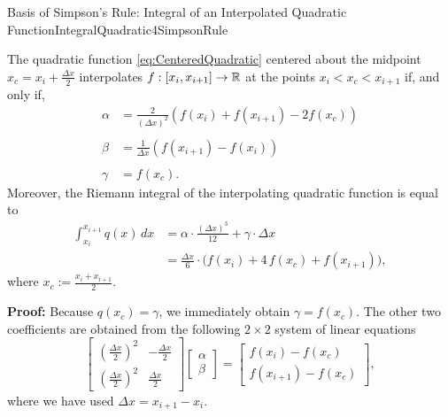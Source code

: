 \bigskip

\begin{propColor}{Basis of Simpson's Rule: Integral of an Interpolated Quadratic Function}{IntegralQuadratic4SimpsonRule} 

The quadratic function \eqref{eq:CenteredQuadratic} centered about the midpoint  $x_c = x_i + \frac{\Delta x}{2}$ interpolates $f:[x_i, x_{i+1}] \to \mathbb R$ at the points $x_i < x_c < x_{i+1}$ if, and only if,
\begin{equation}
    \label{eq:QuadraticInterpConditions}
    \begin{aligned}
        \alpha &= \frac{2}{(\Delta x )^2} \left( f(x_i) +  f(x_{i+1}) - 2 f(x_c) \right)   \\
        \\
         \beta &=   \frac{1}{\Delta x} \left( f(x_{i+1}) - f(x_i) \right)  \\
         \\
         \gamma &= f(x_c).
    \end{aligned}
\end{equation}
Moreover, the Riemann integral of the interpolating quadratic function is equal to
\begin{equation}
\begin{aligned}
\int_{x_i}^{x_{i+1}} q(x)\, dx & = \alpha \cdot \frac{(\Delta x)^3}{12} + \gamma \cdot \Delta x \\
      & = \frac{ \Delta x}{6} \cdot \big(  f(x_i) + 4 \, f(x_c) + f(x_{i+1}) \big),
\end{aligned}   
\end{equation}
where $x_c:=\frac{x_i + x_{i+1}}{2}$.

\end{propColor}

\textbf{Proof:} Because $q(x_c) = \gamma$, we immediately obtain $\gamma = f(x_c)$. The other two coefficients are obtained from the following $2 \times 2$ system of linear equations
$$  \left[
\begin{array}{rr}
\left( \frac{\Delta x}{2}\right)^2 & -\frac{\Delta x}{2}\\
\left( \frac{\Delta x}{2}\right)^2 & \frac{\Delta x}{2}
\end{array}
\right] \left[\begin{array}{c}
\alpha \\
\beta
\end{array}
\right] = \left[\begin{array}{c}
f(x_i) - f(x_c)\\
f(x_{i+1}) - f(x_c)
\end{array}
\right],$$
where we have used $\Delta x = x_{i+1} - x_i$.\\

